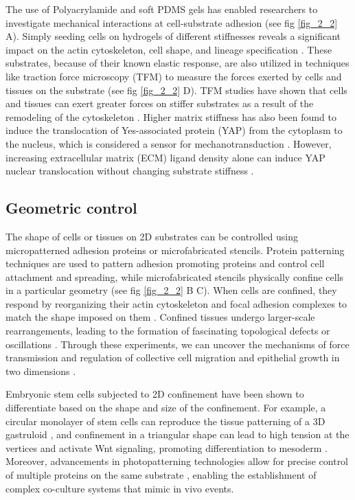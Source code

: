 The use of Polyacrylamide and soft PDMS gels has enabled researchers to investigate mechanical interactions at cell-substrate adhesion (see fig \ref{fig_2_2} A). Simply seeding cells on hydrogels of different stiffnesses reveals a significant impact on the actin cytoskeleton, cell shape, and lineage specification \cite{yeung2005,  engler2006}. These substrates, because of their known elastic response, are also utilized in techniques like traction force microscopy (TFM) to measure the forces exerted by cells and tissues on the substrate \cite{harris1980,  gomez-gonzalez2020} (see fig \ref{fig_2_2} D). TFM studies have shown that cells and tissues can exert greater forces on stiffer substrates as a result of the remodeling of the cytoskeleton \cite{elosegui-artola2016}. Higher matrix stiffness has also been found to induce the translocation of Yes-associated protein (YAP) from the cytoplasm to the nucleus, which is considered a sensor for mechanotransduction \cite{elosegui-artola2017}. However, increasing extracellular matrix (ECM) ligand density alone can induce YAP nuclear translocation without changing substrate stiffness \cite{stanton2019}.

\hypertarget{geometric-control}{%
\subsection{Geometric control}\label{geometric-control}}

The shape of cells or tissues on 2D substrates can be controlled using micropatterned adhesion proteins or microfabricated stencils. Protein patterning techniques are used to pattern adhesion promoting proteins and control cell attachment and spreading, while microfabricated stencils physically confine cells in a particular geometry (see fig \ref{fig_2_2} B C). When cells are confined, they respond by reorganizing their actin cytoskeleton and focal adhesion complexes to match the shape imposed on them \cite{vignaud2012}. Confined tissues undergo larger-scale rearrangements, leading to the formation of fascinating topological defects or oscillations \cite{tlili2018,  balasubramaniam2021,  guillamat2022}. Through these experiments, we can uncover the mechanisms of force transmission and regulation of collective cell migration and epithelial growth in two dimensions \cite{nelson2005,  vedula2012,  deforet2014}.

Embryonic stem cells subjected to 2D confinement have been shown to differentiate based on the shape and size of the confinement. For example, a circular monolayer of stem cells can reproduce the tissue patterning of a 3D gastruloid \cite{warmflash2014}, and confinement in a triangular shape can lead to high tension at the vertices and activate Wnt signaling, promoting differentiation to mesoderm \cite{muncie2020}. Moreover, advancements in photopatterning technologies allow for precise control of multiple proteins on the same substrate \cite{guyon2021, prahl2022}, enabling the establishment of complex co-culture systems that mimic in vivo events.


